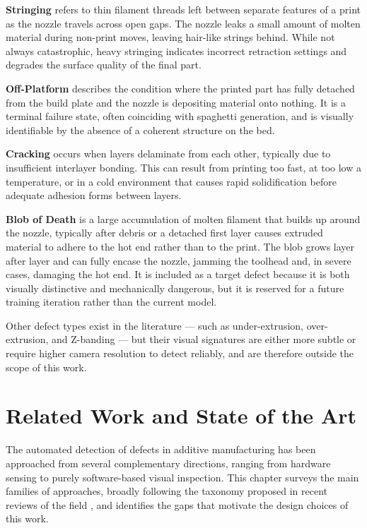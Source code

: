 \documentclass[english, Lau, oneside]{sapthesis}
\begin{document}
\textbf{Stringing} refers to thin filament threads left between separate features of a print as the nozzle travels across open gaps. The nozzle leaks a small amount of molten material during non-print moves, leaving hair-like strings behind. While not always catastrophic, heavy stringing indicates incorrect retraction settings and degrades the surface quality of the final part.

\textbf{Off-Platform} describes the condition where the printed part has fully detached from the build plate and the nozzle is depositing material onto nothing. It is a terminal failure state, often coinciding with spaghetti generation, and is visually identifiable by the absence of a coherent structure on the bed.

\textbf{Cracking} occurs when layers delaminate from each other, typically due to insufficient interlayer bonding. This can result from printing too fast, at too low a temperature, or in a cold environment that causes rapid solidification before adequate adhesion forms between layers.

\textbf{Blob of Death} is a large accumulation of molten filament that builds up around the nozzle, typically after debris or a detached first layer causes extruded material to adhere to the hot end rather than to the print. The blob grows layer after layer and can fully encase the nozzle, jamming the toolhead and, in severe cases, damaging the hot end. It is included as a target defect because it is both visually distinctive and mechanically dangerous, but it is reserved for a future training iteration rather than the current model.

Other defect types exist in the literature --- such as under-extrusion, over-extrusion, and Z-banding --- but their visual signatures are either more subtle or require higher camera resolution to detect reliably, and are therefore outside the scope of this work.

\chapter{Related Work and State of the Art}
\label{chap:related}

The automated detection of defects in additive manufacturing has been approached from several complementary directions, ranging from hardware sensing to purely software-based visual inspection. This chapter surveys the main families of approaches, broadly following the taxonomy proposed in recent reviews of the field \cite{armin2025}, and identifies the gaps that motivate the design choices of this work.
\end{document}
